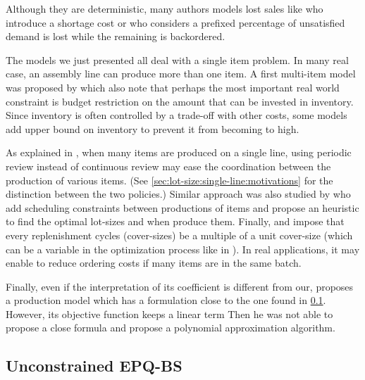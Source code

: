 Although they are deterministic, many authors models lost sales like \citet{Salameh2003} who introduce a shortage cost or \citet{Park1982} who considers a prefixed percentage of unsatisfied demand is lost while the remaining is backordered.


\medskip


The models we just presented all deal with a single item problem.
In many real case, an assembly line can produce more than one item.
A first multi-item model was proposed by \citet{Hadley1963} which also note that perhaps the most important real world constraint is budget restriction on the amount that can be invested in inventory.
Since inventory is often controlled by a trade-off with other costs, some models add upper bound on inventory to prevent it from becoming to high.


As explained in \citet{Eynan2007}, when many items are produced on a single line, using periodic review instead of continuous review may ease the coordination between the production of various items.
(See \cref{sec:lot-size:single-line:motivations} for the distinction between the two policies.)
Similar approach was also studied by \citet{Madigan1968} who add scheduling constraints between productions of items and propose an heuristic to find the optimal lot-sizes and when produce them.
Finally, \citet{Bomberger1966} and \citet{Goyal1974} impose that every replenishment cycles (cover-sizes) be a multiple of a unit cover-size (which can be a variable in the optimization process like in \citet{Silver1976}).
In real applications, it may enable to reduce ordering costs if many items are in the same batch.


\medskip


Finally, even if the interpretation of its coefficient is different from our, \citet{Ziegler1982} proposes a production model which has a formulation close to the one found in \cref{sec:lot-size:single-line:models:unconstrained}.
However, its objective function keeps a linear term
Then he was not able to propose a close formula and propose a polynomial approximation algorithm.



\subsection{Unconstrained EPQ-BS}
\label{sec:lot-size:single-line:models:unconstrained}


